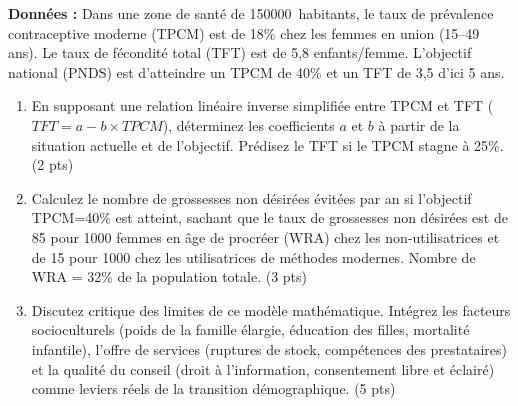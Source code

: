 \documentclass[11pt]{article}
\begin{document}
\begin{exercice}
\textbf{Données :} Dans une zone de santé de \SI{150000}{habitants}, le taux de prévalence contraceptive moderne (TPCM) est de 18\% chez les femmes en union (15--49 ans). Le taux de fécondité total (TFT) est de 5,8 enfants/femme. L'objectif national (PNDS) est d'atteindre un TPCM de 40\% et un TFT de 3,5 d'ici 5 ans.

\begin{enumerate}
    \item En supposant une relation linéaire inverse simplifiée entre TPCM et TFT ($TFT = a - b \times TPCM$), déterminez les coefficients $a$ et $b$ à partir de la situation actuelle et de l'objectif. Prédisez le TFT si le TPCM stagne à 25\%. (2 pts)
    \item Calculez le nombre de grossesses non désirées évitées par an si l'objectif TPCM=40\% est atteint, sachant que le taux de grossesses non désirées est de 85 pour 1000 femmes en âge de procréer (WRA) chez les non-utilisatrices et de 15 pour 1000 chez les utilisatrices de méthodes modernes. Nombre de WRA = 32\% de la population totale. (3 pts)
    \item Discutez critique des limites de ce modèle mathématique. Intégrez les facteurs socioculturels (poids de la famille élargie, éducation des filles, mortalité infantile), l'offre de services (ruptures de stock, compétences des prestataires) et la qualité du conseil (droit à l'information, consentement libre et éclairé) comme leviers réels de la transition démographique. (5 pts)
\end{enumerate}
\end{exercice}
\end{document}

